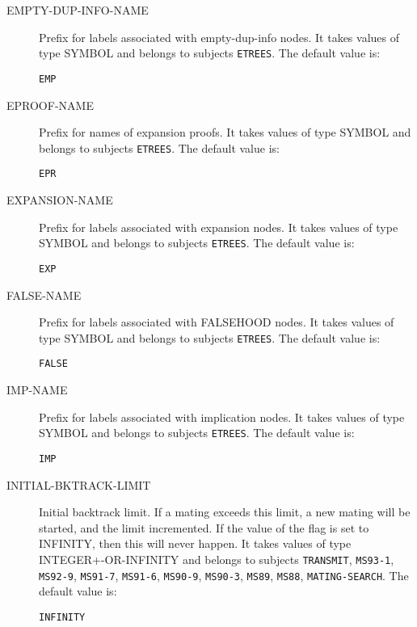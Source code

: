 \begin{description}
\item[EMPTY-DUP-INFO-NAME]  
Prefix for labels associated with empty-dup-info nodes.
It takes values of type SYMBOL and belongs to subjects \texttt{ETREES}.  The default value is: \begin{lstlisting}
EMP
\end{lstlisting}

\item[EPROOF-NAME]  
Prefix for names of expansion proofs.
It takes values of type SYMBOL and belongs to subjects \texttt{ETREES}.  The default value is: \begin{lstlisting}
EPR
\end{lstlisting}

\item[EXPANSION-NAME]  
Prefix for labels associated with expansion nodes.
It takes values of type SYMBOL and belongs to subjects \texttt{ETREES}.  The default value is: \begin{lstlisting}
EXP
\end{lstlisting}

\item[FALSE-NAME]  
Prefix for labels associated with FALSEHOOD nodes.
It takes values of type SYMBOL and belongs to subjects \texttt{ETREES}.  The default value is: \begin{lstlisting}
FALSE
\end{lstlisting}

\item[IMP-NAME]  
Prefix for labels associated with implication nodes.
It takes values of type SYMBOL and belongs to subjects \texttt{ETREES}.  The default value is: \begin{lstlisting}
IMP
\end{lstlisting}

\item[INITIAL-BKTRACK-LIMIT]  
Initial backtrack limit.  If a mating exceeds this limit, a new
    mating will be started, and the limit incremented. If the value of the 
    flag is set to INFINITY, then this will never happen.
It takes values of type INTEGER+-OR-INFINITY and belongs to subjects \texttt{TRANSMIT}, \texttt{MS93-1}, \texttt{MS92-9}, \texttt{MS91-7}, \texttt{MS91-6}, \texttt{MS90-9}, \texttt{MS90-3}, \texttt{MS89}, \texttt{MS88}, \texttt{MATING-SEARCH}.  The default value is: \begin{lstlisting}
INFINITY
\end{lstlisting}


\end{description}
